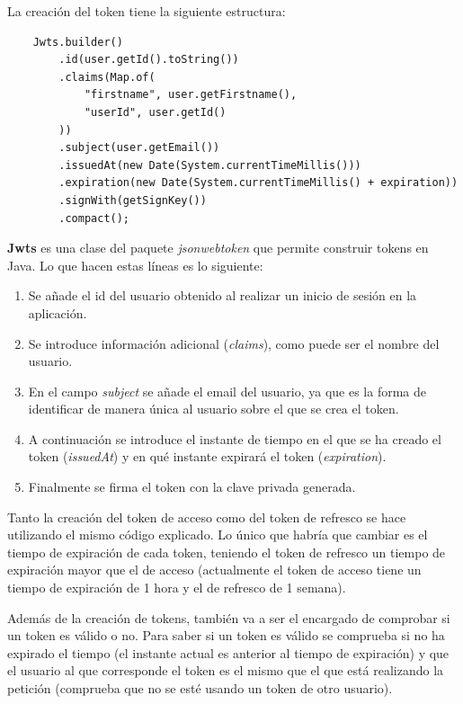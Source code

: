 La creación del token tiene la siguiente estructura:

\begin{verbatim}
    Jwts.builder()
        .id(user.getId().toString())
        .claims(Map.of(
            "firstname", user.getFirstname(),
            "userId", user.getId()
        ))
        .subject(user.getEmail())
        .issuedAt(new Date(System.currentTimeMillis()))
        .expiration(new Date(System.currentTimeMillis() + expiration))
        .signWith(getSignKey())
        .compact();
\end{verbatim}

\textbf{Jwts} es una clase del paquete \textit{jsonwebtoken} que permite construir tokens en Java. Lo que hacen estas líneas es lo siguiente:

\begin{enumerate}
    \item Se añade el id del usuario obtenido al realizar un inicio de sesión en la aplicación.
    \item Se introduce información adicional (\textit{claims}), como puede ser el nombre del usuario.
    \item En el campo \textit{subject} se añade el email del usuario, ya que es la forma de identificar de manera única al usuario sobre el que se crea el token.
    \item A continuación se introduce el instante de tiempo en el que se ha creado el token (\textit{issuedAt}) y en qué instante expirará el token (\textit{expiration}).
    \item Finalmente se firma el token con la clave privada generada.
\end{enumerate}

Tanto la creación del token de acceso como del token de refresco se hace utilizando el mismo código explicado. Lo único que habría que cambiar es el tiempo de expiración
de cada token, teniendo el token de refresco un tiempo de expiración mayor que el de acceso (actualmente el token de acceso tiene un tiempo de expiración de 1 hora y el
de refresco de 1 semana).

Además de la creación de tokens, también va a ser el encargado de comprobar si un token es válido o no. Para saber si un token es válido se comprueba si no ha expirado
el tiempo (el instante actual es anterior al tiempo de expiración) y que el usuario al que corresponde el token es el mismo que el que está realizando la petición (comprueba
que no se esté usando un token de otro usuario).

